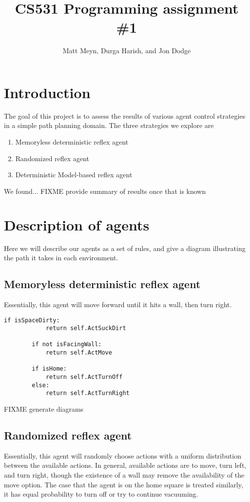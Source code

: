 \documentclass{article}
\title{CS531 Programming assignment \#1}
\author{Matt Meyn, Durga Harish, and Jon Dodge}
\begin{document}
\maketitle

\section{Introduction}
The goal of this project is to assess the results of various agent control strategies in a simple path planning domain.
The three strategies we explore are
\begin{enumerate}
\item Memoryless deterministic reflex agent
\item Randomized reflex agent
\item Deterministic Model-based reflex agent
\end{enumerate}

We found... FIXME provide summary of results once that is known

\section{Description of agents}
Here we will describe our agents as a set of rules, and give a diagram illustrating the path it takes in each environment.

\subsection{Memoryless deterministic reflex agent}
Essentially, this agent will move forward until it hits a wall, then turn right.

\begin{lstlisting}[frame=single]
		if isSpaceDirty:
			return self.ActSuckDirt
		
		if not isFacingWall:
			return self.ActMove
			
		if isHome:
			return self.ActTurnOff
		else:
			return self.ActTurnRight
\end{lstlisting}

FIXME generate diagrams

\subsection{Randomized reflex agent}
Essentially, this agent will randomly choose actions with a uniform distribution between the available actions. 
In general, available actions are to move, turn left, and turn right, though the existence of a wall may remove the availability of the move option.
The case that the agent is on the home square is treated similarly, it has equal probability to turn off or try to continue vacuuming.
\end{document}
